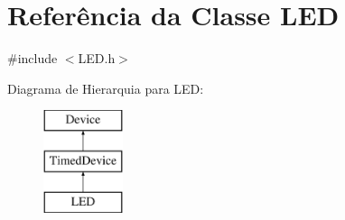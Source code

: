 \hypertarget{classLED}{\section{Referência da Classe L\-E\-D}
\label{classLED}
}


{\ttfamily \#include $<$L\-E\-D.\-h$>$}

Diagrama de Hierarquia para L\-E\-D\-:\begin{figure}[H]
\begin{center}
\leavevmode
\includegraphics[height=3.000000cm]{classLED}
\end{center}
\end{figure}
